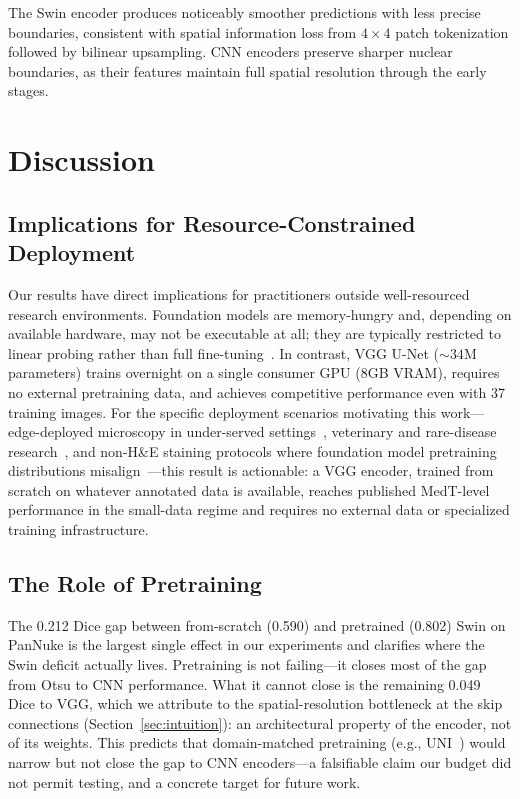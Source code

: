 \documentclass{article}
\begin{document}
The Swin encoder produces noticeably smoother predictions with less precise boundaries, consistent with spatial information loss from $4\times4$ patch tokenization followed by bilinear upsampling. CNN encoders preserve sharper nuclear boundaries, as their features maintain full spatial resolution through the early stages.

\section{Discussion}

\subsection{Implications for Resource-Constrained Deployment}

Our results have direct implications for practitioners outside well-resourced research environments. Foundation models are memory-hungry and, depending on available hardware, may not be executable at all; they are typically restricted to linear probing rather than full fine-tuning~\cite{tizhoosh2025why}. In contrast, VGG U-Net (${\sim}34$M parameters) trains overnight on a single consumer GPU (8GB VRAM), requires no external pretraining data, and achieves competitive performance even with 37 training images. For the specific deployment scenarios motivating this work---edge-deployed microscopy in under-served settings~\cite{salido2025realtime}, veterinary and rare-disease research~\cite{xiao2025review, neal2025artificial}, and non-H\&E staining protocols where foundation model pretraining distributions misalign~\cite{hua2024pathoduet, dejong2025current}---this result is actionable: a VGG encoder, trained from scratch on whatever annotated data is available, reaches published MedT-level performance in the small-data regime and requires no external data or specialized training infrastructure.

\subsection{The Role of Pretraining}

The 0.212 Dice gap between from-scratch (0.590) and pretrained (0.802) Swin on PanNuke is the largest single effect in our experiments and clarifies where the Swin deficit actually lives. Pretraining is not failing---it closes most of the gap from Otsu to CNN performance. What it cannot close is the remaining 0.049 Dice to VGG, which we attribute to the spatial-resolution bottleneck at the skip connections (Section~\ref{sec:intuition}): an architectural property of the encoder, not of its weights. This predicts that domain-matched pretraining (e.g., UNI~\cite{chen2024uni}) would narrow but not close the gap to CNN encoders---a falsifiable claim our budget did not permit testing, and a concrete target for future work.
\end{document}
